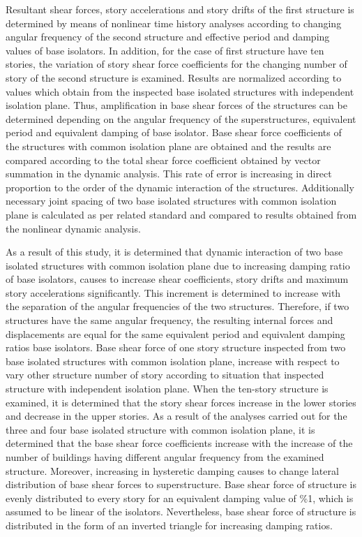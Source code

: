 Resultant shear forces, story accelerations and story drifts of the
first structure is determined by means of nonlinear time history analyses
according to changing angular frequency of the second structure and
effective period and damping values of base isolators. In addition,
for the case of first structure have ten stories, the variation of
story shear force coefficients for the changing number of story of
the second structure is examined. Results are normalized according
to values which obtain from the inspected base isolated structures
with independent isolation plane. Thus, amplification in base shear
forces of the structures can be determined depending on the angular
frequency of the superstructures, equivalent period and equivalent
damping of base isolator. Base shear force coefficients of the structures
with common isolation plane are obtained and the results are compared
according to the total shear force coefficient obtained by vector
summation in the dynamic analysis. This rate of error is increasing
in direct proportion to the order of the dynamic interaction of the
structures. Additionally necessary joint spacing of two base isolated
structures with common isolation plane is calculated as per related
standard and compared to results obtained from the nonlinear dynamic
analysis.

As a result of this study, it is determined that dynamic interaction
of two base isolated structures with common isolation plane due to
increasing damping ratio of base isolators, causes to increase shear
coefficients, story drifts and maximum story accelerations significantly.
This increment is determined to increase with the separation of the
angular frequencies of the two structures. Therefore, if two structures
have the same angular frequency, the resulting internal forces and
displacements are equal for the same equivalent period and equivalent
damping ratios base isolators. Base shear force of one story structure
inspected from two base isolated structures with common isolation
plane, increase with respect to vary other structure number of story
according to situation that inspected structure with independent isolation
plane. When the ten-story structure is examined, it is determined
that the story shear forces increase in the lower stories and decrease
in the upper stories. As a result of the analyses carried out for
the three and four base isolated structure with common isolation plane,
it is determined that the base shear force coefficients increase with
the increase of the number of buildings having different angular frequency
from the examined structure. Moreover, increasing in hysteretic damping
causes to change lateral distribution of base shear forces to superstructure.
Base shear force of structure is evenly distributed to every story
for an equivalent damping value of \%1, which is assumed to be linear
of the isolators. Nevertheless, base shear force of structure is distributed
in the form of an inverted triangle for increasing damping ratios.
